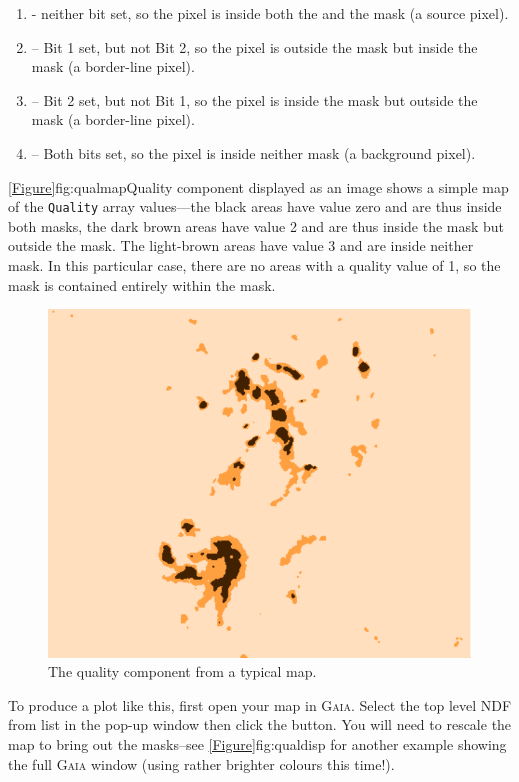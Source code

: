 \begin{enumerate}
\item - neither bit set, so the pixel is inside both the  and the  mask
(a source pixel).

\item -- Bit 1 set, but not Bit 2, so the pixel is outside the  mask but
inside the  mask (a border-line pixel).

\item -- Bit 2 set, but not Bit 1, so the pixel is inside the  mask but
outside the  mask (a border-line pixel).

\item -- Both bits set, so the pixel is inside neither mask (a background
pixel).
\end{enumerate}

\cref{Figure}{fig:qualmap}{Quality component displayed as an image} shows
a simple map of the \texttt{Quality} array values---the black areas have
value zero and are thus inside both masks, the dark brown areas have value 2
and are thus inside the  mask but outside the  mask.
The light-brown areas have value 3 and are inside neither mask. In this
particular case, there are no  areas with a quality value of 1, so the
 mask is contained entirely within the  mask.

\begin{figure}[t!]
\includegraphics[width=0.6\linewidth]{sc21_qual}
\caption[Quality component displayed as an image]{The quality component
from a typical map.}
\label{fig:qualmap}
\end{figure}

To produce a plot like this, first open your map in \textsc{Gaia}. Select
the top level NDF from list in the pop-up window then click the
 button. You will need to rescale the map to bring
out the masks--see \cref{Figure}{fig:qualdisp}{} for another example
showing the full \textsc{Gaia} window (using rather brighter colours this
time!).

